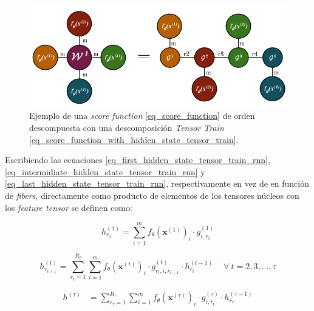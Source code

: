 \documentclass[spanish]{article}
\theoremstyle{definition}
\theoremstyle{remark}
\numberwithin{equation}{section}
\numberwithin{equation}{section} %
\begin{document}
\par
\begin{figure}[H]
 \centering
 \includegraphics[width=12cm]{img/ejemplo_score_function_descomposicion_tensor_train.png}
\caption[Ejemplo \textit{score function} con una descomposición \textit{Tensor Train}]{\footnotesize{ Ejemplo de una \textit{score function} \eqref{eq_score_function} de orden descompuesta con una descomposición \textit{Tensor Train} \eqref{eq_score_function_with_hidden_state_tensor_train}. }}
\label{fig:score_function_tensor_train}
\end{figure}\par
Escribiendo las ecuaciones \eqref{eq_first_hidden_state_tensor_train_rnn},  \eqref{eq_intermidiate_hidden_state_tensor_train_rnn} y \eqref{eq_last_hidden_state_tensor_train_rnn}, respectivamente en vez de en función de \textit{fibers}, directamente como producto de elementos de los tensores núcleos con los \textit{feature tensor} se definen como: 
\par
\begin{equation}
\label{eq_first_hidden_state_tensor_train_core_tensors_element}
h^{(1)}_{r_2}  
= \sum_{i=1}^m f_\theta (\boldsymbol{x}^{(1)})_i \cdot g^{(1)}_{i,r_2} 
\end{equation} \par
\begin{equation}
\label{eq_intermidiate_hidden_state_tensor_train_core_tensors_element}
h^{(t)}_{r_{t+1}}  
= \sum^{R_{t}}_{r_{t}=1} \sum_{i=1}^m  f_\theta (\boldsymbol{x}^{(t)})_i \cdot g^{(t)}_{r_{t},i,r_{t+1}} \cdot  {h}^{(t-1)}_{r_t} \ \quad \forall \ t=2,3,...,\tau
\end{equation} \par
\begin{equation}
\label{eq_last_hidden_state_tensor_train_core_tensors_element}
\begin{split}
h^{(\tau)} &
= \sum^{R_{\tau}}_{r_{\tau}=1} \sum^{m}_{i=1} f_\theta(\boldsymbol{x}^{(\tau)})_{i} \cdot g^{(\tau)}_{i ,r_t} \cdot h^{(\tau-1)}_{r_\tau}
\end{split}
\end{equation} \par
\end{document}
